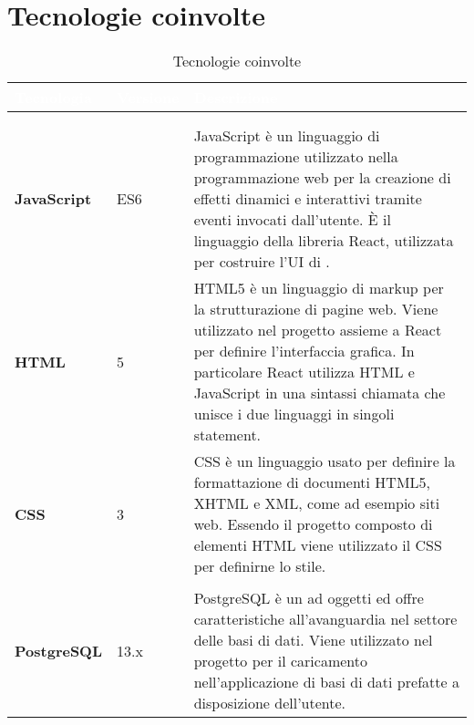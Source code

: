 \section{Tecnologie coinvolte}

{
\setlength\arrayrulewidth{0.95pt}
\renewcommand{\arraystretch}{1.5}
\begin{longtable}{C{3cm} C{2cm} C{10cm}}

\textcolor{white}{\textbf{Tecnologia}}&
\textcolor{white}{\textbf{Versione}}&
\textcolor{white}{\textbf{Descrizione}} \\
\endfirsthead
{}\\
\endfoot
{}\caption{Tecnologie coinvolte}
\endlastfoot
	
 \\

	\textbf{JavaScript} & 
	ES6 &
	JavaScript è un linguaggio di programmazione utilizzato nella programmazione web per la creazione di effetti dinamici e interattivi tramite eventi invocati dall'utente. È il linguaggio della libreria React, utilizzata per costruire l'UI di \NomeProgetto{}.\\

	\textbf{HTML} &
	5 &
	HTML5 è un linguaggio di markup per la strutturazione di pagine web. Viene utilizzato nel progetto \NomeProgetto{} assieme a React per definire l'interfaccia grafica. In particolare React utilizza HTML e JavaScript in una sintassi chiamata  che unisce i due linguaggi in singoli statement.\\
	
	\textbf{CSS} &
	3 & 
	CSS è un linguaggio usato per definire la formattazione di documenti HTML5, XHTML e XML, come ad esempio siti web.
Essendo il progetto \NomeProgetto{} composto di elementi HTML viene utilizzato il CSS per definirne lo stile. \\
	
 \\

	\textbf{PostgreSQL} & 
	13.x &
	PostgreSQL è un  ad oggetti ed offre caratteristiche all'avanguardia nel settore delle basi di dati. Viene utilizzato nel progetto per il caricamento nell'applicazione di basi di dati prefatte a disposizione dell'utente. \\
 

\end{longtable}}
